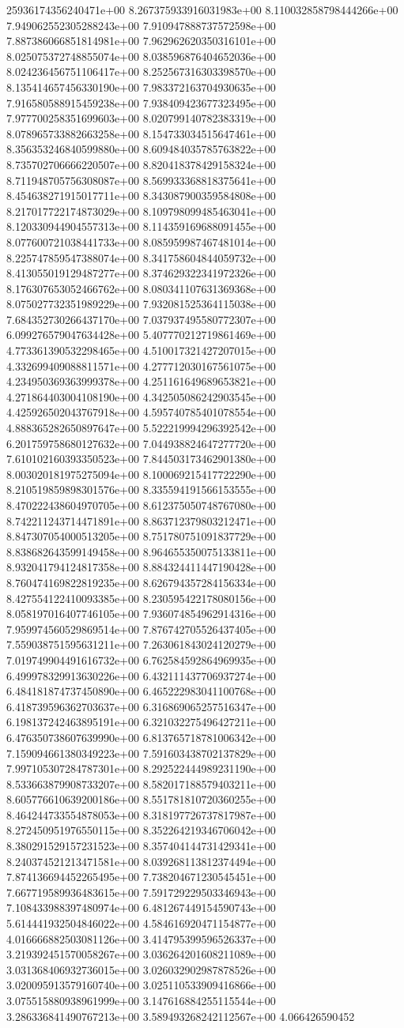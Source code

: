 25936174356240471e+00	8.267375933916031983e+00	8.110032858798444266e+00	7.949062552305288243e+00	7.910947888737572598e+00	7.887386066851814981e+00	7.962962620350316101e+00	8.025075372748855074e+00	8.038596876404652036e+00	8.024236456751106417e+00	8.252567316303398570e+00	8.135414657456330190e+00	7.983372163704930635e+00	7.916580588915459238e+00	7.938409423677323495e+00	7.977700258351699603e+00	8.020799140782383319e+00	8.078965733882663258e+00	8.154733034515647461e+00	8.356353246840599880e+00	8.609484035785763822e+00	8.735702706666220507e+00	8.820418378429158324e+00	8.711948705756308087e+00	8.569933368818375641e+00	8.454638271915017711e+00	8.343087900359584808e+00	8.217017722174873029e+00	8.109798099485463041e+00	8.120330944904557313e+00	8.114359169688091455e+00	8.077600721038441733e+00	8.085959987467481014e+00	8.225747859547388074e+00	8.341758604844059732e+00	8.413055019129487277e+00	8.374629322341972326e+00	8.176307653052466762e+00	8.080341107631369368e+00	8.075027732351989229e+00	7.932081525364115038e+00	7.684352730266437170e+00	7.037937495580772307e+00	6.099276579047634428e+00	5.407770212719861469e+00	4.773361390532298465e+00	4.510017321427207015e+00	4.332699409088811571e+00	4.277712030167561075e+00	4.234950369363999378e+00	4.251161649689653821e+00	4.271864403004108190e+00	4.342505086242903545e+00	4.425926502043767918e+00	4.595740785401078554e+00	4.888365282650897647e+00	5.522219994296392542e+00	6.201759758680127632e+00	7.044938824647277720e+00	7.610102160393350523e+00	7.844503173462901380e+00	8.003020181975275094e+00	8.100069215417722290e+00	8.210519859898301576e+00	8.335594191566153555e+00	8.470222438604970705e+00	8.612375050748767080e+00	8.742211243714471891e+00	8.863712379803212471e+00	8.847307054000513205e+00	8.751780751091837729e+00	8.838682643599149458e+00	8.964655350075133811e+00	8.932041794124817358e+00	8.884324411447190428e+00	8.760474169822819235e+00	8.626794357284156334e+00	8.427554122410093385e+00	8.230595422178080156e+00	8.058197016407746105e+00	7.936074854962914316e+00	7.959974560529869514e+00	7.876742705526437405e+00	7.559038751595631211e+00	7.263061843024120279e+00	7.019749904491616732e+00	6.762584592864969935e+00	6.499978329913630226e+00	6.432111437706937274e+00	6.484181874737450890e+00	6.465222983041100768e+00	6.418739596362703637e+00	6.316869065257516347e+00	6.198137242463895191e+00	6.321032275496427211e+00	6.476350738607639990e+00	6.813765718781006342e+00	7.159094661380349223e+00	7.591603438702137829e+00	7.997105307284787301e+00	8.292522444989231190e+00	8.533663879908733207e+00	8.582017188579403211e+00	8.605776610639200186e+00	8.551781810720360255e+00	8.464244733554878053e+00	8.318197726737817987e+00	8.272450951976550115e+00	8.352264219346706042e+00	8.380291529157231523e+00	8.357404144731429341e+00	8.240374521213471581e+00	8.039268113812374494e+00	7.874136694452265495e+00	7.738204671230545451e+00	7.667719589936483615e+00	7.591729229503346943e+00	7.108433988397480974e+00	6.481267449154590743e+00	5.614441932504846022e+00	4.584616920471154877e+00	4.016666882503081126e+00	3.414795399596526337e+00	3.219392451570058267e+00	3.036264201608211089e+00	3.031368406932736015e+00	3.026032902987878526e+00	3.020095913579160740e+00	3.025110533909416866e+00	3.075515880938961999e+00	3.147616884255115544e+00	3.286336841490767213e+00	3.589493268242112567e+00	4.066426590452